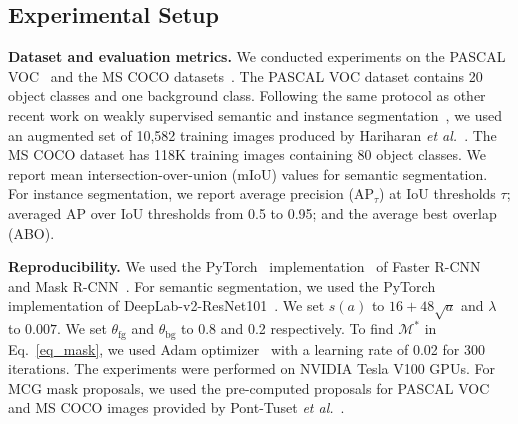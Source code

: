 \documentclass[final]{cvpr}
\begin{document}
\subsection{Experimental Setup}\label{setup}
\textbf{Dataset and evaluation metrics.} We conducted experiments on the PASCAL VOC~\cite{everingham2010pascal} and the MS COCO datasets~\cite{lin2014microsoft}.
The PASCAL VOC dataset contains 20 object classes and one background class. 
Following the same protocol as other recent work on weakly supervised semantic and instance segmentation~\cite{ahn2019weakly, arun2020weakly, hsu2019weakly, song2019box}, we used an augmented set of 10,582 training images produced by Hariharan \textit{et al.}~\cite{hariharan2011semantic}. 
The MS COCO dataset has 118K training images containing 80 object classes.
We report mean intersection-over-union (mIoU) values for semantic segmentation. For instance segmentation, we report average precision (AP$_{\tau}$) at IoU thresholds $\tau$; averaged AP over IoU thresholds from 0.5 to 0.95; and the average best overlap (ABO). 

\textbf{Reproducibility.}
We used the PyTorch~\cite{paszke2017automatic} implementation~\cite{massa2018mrcnn} of Faster R-CNN~\cite{ren2015faster} and Mask R-CNN~\cite{he2017mask}.
For semantic segmentation, we used the PyTorch implementation of DeepLab-v2-ResNet101~\cite{pytorchdeeplab}.
We set $s(a)$ to $16+48\sqrt{a}$ and $\lambda$ to $0.007$. We set $\theta_{\text{fg}}$ and $\theta_{\text{bg}}$ to 0.8 and 0.2 respectively. To find $\mathcal{M}^{*}$ in Eq.~\ref{eq_mask}, we used Adam optimizer~\cite{kingma2014adam} with a learning rate of 0.02 for 300 iterations. The experiments were performed on NVIDIA Tesla V100 GPUs. For MCG mask proposals, we used the pre-computed proposals for PASCAL VOC and MS COCO images provided by Pont-Tuset \textit{et al.}~\cite{pont2016multiscale}.
\end{document}
